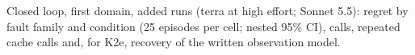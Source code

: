 \begin{table}[!htbp]
\centering
\caption{Closed loop, first domain, added runs (terra at high effort; Sonnet 5.5): regret by fault family and condition (25 episodes per cell; nested 95\% CI), calls, repeated cache calls and, for K2e, recovery of the written observation model.}
\label{tab:agent-llm-added}
\scriptsize
\setlength{\tabcolsep}{3pt}
\resizebox{\linewidth}{!}{}
\end{table}
